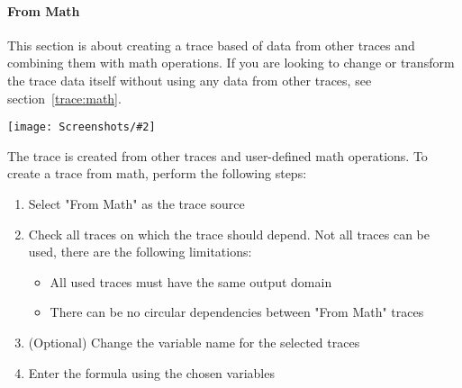 \documentclass[a4paper,11pt]{article}
\newcommand\info[1][5ex]{%
  \renewcommand\stacktype{L}%
  \scaleto{\stackon[1.2pt]{\color{blue}$\bigcirc$}{\raisebox{-1.5pt}{\small i}}}{#1}%
}
\newenvironment{information}[1][]{%
   \begin{mdframed}[%
      backgroundcolor={blue!15}, hidealllines=true,
      skipabove=0.7\baselineskip, skipbelow=0.7\baselineskip,
      splitbottomskip=2pt, splittopskip=4pt, #1]%
   \makebox[0pt]{%
      \smash{%
         \hspace*{-45pt}%
         \raisebox{-5pt}{%
            {\info}%
         }%
      }%
   }%
}{\end{mdframed}}
\newcommand{\screenshot}[2]{\begin{center}
\texttt{[image: Screenshots/\#2]}
\end{center}}
\begin{document}
\paragraph{From Math}
\label{trace:fromMath}
\begin{information}
This section is about creating a trace based of data from other traces and combining them with math operations. If you are looking to change or transform the trace data itself without using any data from other traces, see section~\ref{trace:math}.
\end{information}
\screenshot{0.5}{FromMath.png}
The trace is created from other traces and user-defined math operations. To create a trace from math, perform the following steps:
\begin{enumerate}
\item Select "From Math" as the trace source
\item Check all traces on which the trace should depend. Not all traces can be used, there are the following limitations:
\begin{itemize}
\item All used traces must have the same output domain
\item There can be no circular dependencies between "From Math" traces
\end{itemize}
\item (Optional) Change the variable name for the selected traces
\item Enter the formula using the chosen variables
\end{enumerate}
\end{document}
